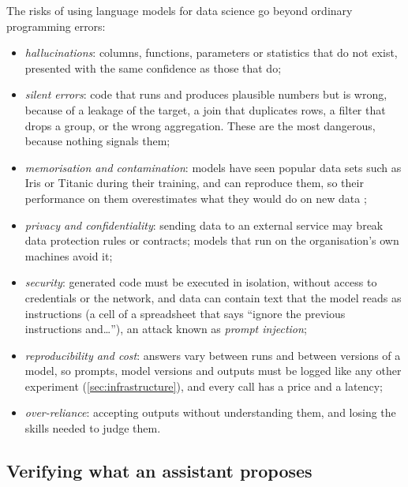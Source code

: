 The risks of using language models for data science go beyond ordinary programming errors:
\begin{itemize}
  \item \emph{hallucinations}: columns, functions, parameters or statistics that do not exist, presented with the same
        confidence as those that do;
  \item \emph{silent errors}: code that runs and produces plausible numbers but is wrong, because of a leakage of the target, a
        join that duplicates rows, a filter that drops a group, or the wrong aggregation. These are the most dangerous, because
        nothing signals them;
  \item \emph{memorisation and contamination}: models have seen popular data sets such as Iris or Titanic during their training,
        and can reproduce them, so their performance on them overestimates what they would do on new data
        \citep{bordt2024elephants};
  \item \emph{privacy and confidentiality}: sending data to an external service may break data protection rules or contracts;
        models that run on the organisation's own machines avoid it;
  \item \emph{security}: generated code must be executed in isolation, without access to credentials or the network, and data
        can contain text that the model reads as instructions (a cell of a spreadsheet that says ``ignore the previous
        instructions and\dots''), an attack known as \emph{prompt injection};
  \item \emph{reproducibility and cost}: answers vary between runs and between versions of a model, so prompts, model versions and
        outputs must be logged like any other experiment (\cref{sec:infrastructure}), and every call has a price and a latency;
  \item \emph{over-reliance}: accepting outputs without understanding them, and losing the skills needed to judge them.
\end{itemize}

\subsection{Verifying what an assistant proposes}\label{sec:llmverify}

